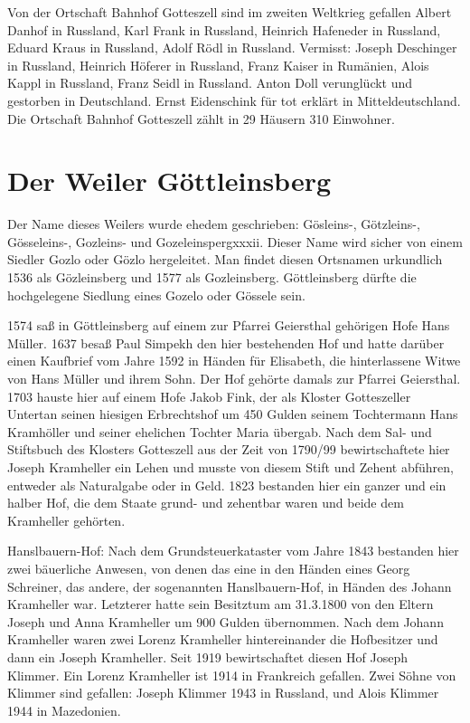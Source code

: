 \documentclass[12pt,a4pager]{book}
\begin{document}
Von der Ortschaft Bahnhof Gotteszell sind im zweiten Weltkrieg gefallen Albert
Danhof in Russland, Karl Frank in Russland, Heinrich Hafeneder in Russland,
Eduard Kraus in Russland, Adolf Rödl in Russland. Vermisst: Joseph Deschinger in
Russland, Heinrich Höferer in Russland, Franz Kaiser in Rumänien, Alois Kappl in
Russland, Franz Seidl in Russland. Anton Doll verunglückt und gestorben in
Deutschland. Ernst Eidenschink für tot erklärt in Mitteldeutschland. Die
Ortschaft Bahnhof Gotteszell zählt in 29 Häusern 310 Einwohner.

\section{Der Weiler Göttleinsberg}

Der Name dieses Weilers wurde ehedem geschrieben: Gösleins-, Götzleins-,
Gösseleins-, Gozleins- und Gozeleinspergxxxii. Dieser Name wird sicher von einem
Siedler Gozlo oder Gözlo hergeleitet. Man findet diesen Ortsnamen urkundlich
1536 als Gözleinsberg und 1577 als Gozleinsberg. Göttleinsberg dürfte die
hochgelegene Siedlung eines Gozelo oder Gössele sein.

1574 saß in Göttleinsberg auf einem zur Pfarrei Geiersthal gehörigen Hofe Hans
Müller. 1637 besaß Paul Simpekh den hier bestehenden Hof und hatte darüber einen
Kaufbrief vom Jahre 1592 in Händen für Elisabeth, die hinterlassene Witwe von
Hans Müller und ihrem Sohn. Der Hof gehörte damals zur Pfarrei Geiersthal. 1703
hauste hier auf einem Hofe Jakob Fink, der als Kloster Gotteszeller Untertan
seinen hiesigen Erbrechtshof um 450 Gulden seinem Tochtermann Hans Kramhöller
und seiner ehelichen Tochter Maria übergab. Nach dem Sal- und Stiftsbuch des
Klosters Gotteszell aus der Zeit von 1790/99 bewirtschaftete hier Joseph
Kramheller ein Lehen und musste von diesem Stift und Zehent abführen, entweder
als Naturalgabe oder in Geld. 1823 bestanden hier ein ganzer und ein halber Hof,
die dem Staate grund- und zehentbar waren und beide dem Kramheller gehörten.

Hanslbauern-Hof: Nach dem Grundsteuerkataster vom Jahre 1843 bestanden hier zwei
bäuerliche Anwesen, von denen das eine in den Händen eines Georg Schreiner, das
andere, der sogenannten Hanslbauern-Hof, in Händen des Johann Kramheller war.
Letzterer hatte sein Besitztum am 31.3.1800 von den Eltern Joseph und Anna
Kramheller um 900 Gulden übernommen. Nach dem Johann Kramheller waren zwei
Lorenz Kramheller hintereinander die Hofbesitzer und dann ein Joseph Kramheller.
Seit 1919 bewirtschaftet diesen Hof Joseph Klimmer. Ein Lorenz Kramheller ist
1914 in Frankreich gefallen. Zwei Söhne von Klimmer sind gefallen: Joseph
Klimmer 1943 in Russland, und Alois Klimmer 1944 in Mazedonien.
\end{document}
